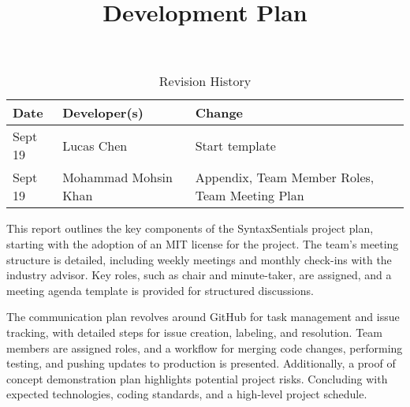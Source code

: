 \documentclass{article}
\title{Development Plan\\\progname}
\author{\authname}
\date{}
\begin{document}
\maketitle

\begin{table}[hp]
\caption{Revision History} \label{TblRevisionHistory}
\begin{tabularx}{\textwidth}{llX}
\toprule
\textbf{Date} & \textbf{Developer(s)} & \textbf{Change}\\
\midrule
Sept 19 & Lucas Chen & Start template\\
Sept 19 & Mohammad Mohsin Khan & Appendix, Team Member Roles, Team Meeting Plan\\
\bottomrule
\end{tabularx}
\end{table}

\newpage{}

This report outlines the key components of the SyntaxSentials project plan, 
starting with the adoption of an MIT license for the project. The team's meeting 
structure is detailed, including weekly meetings and monthly check-ins with the 
industry advisor. Key roles, such as chair and minute-taker, are assigned, and a 
meeting agenda template is provided for structured discussions.

The communication plan revolves around GitHub for task management and issue 
tracking, with detailed steps for issue creation, labeling, and resolution. 
Team members are assigned roles, and a workflow for merging code changes, 
performing testing, and pushing updates to production is presented. Additionally, 
a proof of concept demonstration plan highlights potential project risks. Concluding 
with expected technologies, coding standards, and a high-level project 
schedule.



\end{document}
